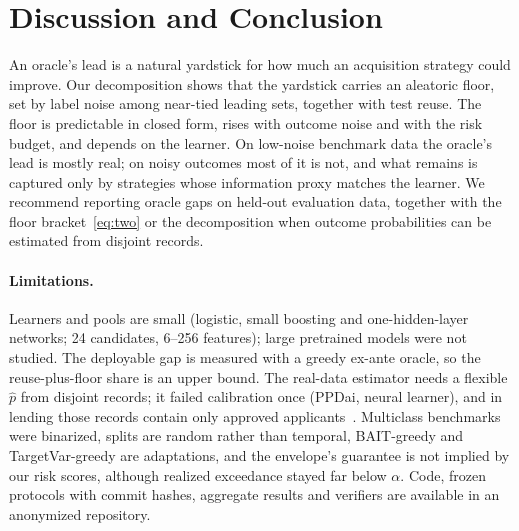 \documentclass[runningheads]{llncs}
\begin{document}
\section{Discussion and Conclusion}
\label{sec:conclusion}
An oracle's lead is a natural yardstick for how much an acquisition strategy could improve. Our decomposition shows that the yardstick carries an aleatoric floor, set by label noise among near-tied leading sets, together with test reuse. The floor is predictable in closed form, rises with outcome noise and with the risk budget, and depends on the learner. On low-noise benchmark data the oracle's lead is mostly real; on noisy outcomes most of it is not, and what remains is captured only by strategies whose information proxy matches the learner. We recommend reporting oracle gaps on held-out evaluation data, together with the floor bracket~\eqref{eq:two} or the decomposition when outcome probabilities can be estimated from disjoint records.

\paragraph{Limitations.} Learners and pools are small (logistic, small boosting and one-hidden-layer networks; 24 candidates, 6--256 features); large pretrained models were not studied. The deployable gap is measured with a greedy ex-ante oracle, so the reuse-plus-floor share is an upper bound. The real-data estimator needs a flexible $\hat p$ from disjoint records; it failed calibration once (PPDai, neural learner), and in lending those records contain only approved applicants~\cite{crook2004reject}. Multiclass benchmarks were binarized, splits are random rather than temporal, BAIT-greedy and TargetVar-greedy are adaptations, and the envelope's guarantee is not implied by our risk scores, although realized exceedance stayed far below $\alpha$. Code, frozen protocols with commit hashes, aggregate results and verifiers are available in an anonymized repository.



\end{document}
